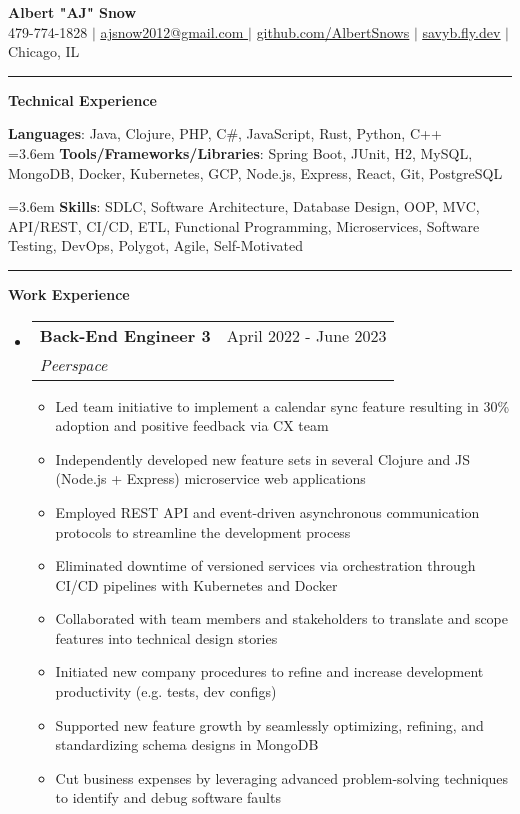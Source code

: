 \documentclass[letterpaper,11pt]{article}
\makeatletter
\newcommand{\resumeItem}[1]{
  \item\small{
    {#1 \vspace{-2pt}}
  }
}
\newcommand{\resumeSubheading}[4]{
  \vspace{-2pt}\item
    \begin{tabular*}{0.97\textwidth}[t]{l@{\extracolsep{\fill}}r}
      \textbf{#1} & #2 \\
      \textit{\small#3} & \textit{\small #4} \\
    \end{tabular*}\vspace{0pt}
}
\newcommand{\resumeSubHeadingListStart}{\begin{itemize}[leftmargin=0.15cm, label={}]}
\newcommand{\resumeSubHeadingListEnd}{\end{itemize}}
\newcommand{\resumeItemListStart}{\begin{itemize}}
\newcommand{\resumeItemListEnd}{\end{itemize}\vspace{-5pt}}
\makeatother
\begin{document}
\textbf{\normalshape \Large \textcolor{magic_blue}{Albert "AJ" Snow}} \\ \vspace{3pt}
\small 479-774-1828 $|$ 
\href{ mailto:ajsnow2012@gmail.com }
{\underline{ ajsnow2012@gmail.com }} $|$
\href{https://github.com/AlbertSnows}{\underline{github.com/AlbertSnows}}
$|$ \href{https://savyb.fly.dev/}{\underline{savyb.fly.dev}}
$|$ Chicago, IL
\noindent\rule{19.5cm}{0.4pt}

\textbf{\large \textcolor{magic_blue}{Technical Experience} }

\begin{onehalfspace}
	\textbf{ Languages}{: Java, Clojure, PHP, C\#, JavaScript, Rust, Python, C++ } \\
	\hangindent=3.6em
	\textbf{ Tools/Frameworks/Libraries}{:
		Spring Boot, JUnit, H2, MySQL,
		MongoDB, Docker, Kubernetes, GCP, Node.js,
		Express, React, Git, PostgreSQL } \\
\end{onehalfspace}

\hangindent=3.6em
\textbf{ Skills}{: }
SDLC, Software Architecture, Database Design, 
OOP, MVC, API/REST, CI/CD,
ETL, Functional Programming, Microservices,
Software Testing, DevOps, Polygot, Agile, 
Self-Motivated
\noindent\rule{19.5cm}{0.4pt}

\textbf{\large \textcolor{magic_blue}{Work Experience}}
\resumeSubHeadingListStart
\resumeSubheading
{Back-End Engineer 3}{April 2022 - June 2023}
{Peerspace}{}
\resumeItemListStart
\resumeItem{ Led team initiative to implement a calendar sync feature resulting in 30\% adoption and positive feedback via CX team}
\resumeItem{ Independently developed new feature sets in several Clojure and JS (Node.js + Express) microservice web applications}
\resumeItem{ Employed REST API and event-driven asynchronous communication protocols to streamline the development process}
\resumeItem{ Eliminated downtime of versioned services via orchestration through CI/CD pipelines with Kubernetes and Docker }
\resumeItem{ Collaborated with team members and stakeholders to translate and scope features into technical design stories}
\resumeItem{ Initiated new company procedures to refine and increase development productivity (e.g. tests, dev configs)}
\resumeItem{ Supported new feature growth by seamlessly optimizing, refining, and standardizing schema designs in MongoDB}
\resumeItem{ Cut business expenses by leveraging advanced problem-solving techniques to identify and debug software faults}
\resumeItemListEnd
\resumeSubHeadingListEnd
\end{document}
